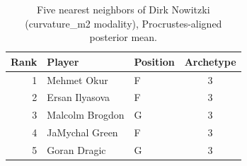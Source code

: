 \begin{table}[htbp]
  \centering\small
  \begin{tabular}{rllc}
    \toprule
    Rank & Player & Position & Archetype \\
    \midrule
    1 & Mehmet Okur & F & 3 \\
    2 & Ersan Ilyasova & F & 3 \\
    3 & Malcolm Brogdon & G & 3 \\
    4 & JaMychal Green & F & 3 \\
    5 & Goran Dragic & G & 3 \\
    \bottomrule
  \end{tabular}
  \caption{Five nearest neighbors of Dirk Nowitzki (curvature_m2 modality), Procrustes-aligned posterior mean.}
  \label{tab:Dirk_Nowitzki_neighbors_curvature_m2}
\end{table}

